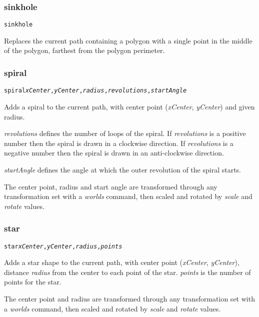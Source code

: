 \subsubsection{sinkhole}

\begin{alltt}
sinkhole
\end{alltt}

Replaces the current path containing a polygon with a single point in the
middle of the polygon, farthest from the polygon perimeter.

\subsubsection{spiral}

\begin{alltt}
spiral \textit{xCenter}, \textit{yCenter}, \textit{radius}, \textit{revolutions}, \textit{startAngle}
\end{alltt}

Adds a spiral to the current path, with center
point (\textit{xCenter}, \textit{yCenter}) and given radius.

\textit{revolutions} defines the number of loops of the spiral.
If \textit{revolutions}
is a positive number then the spiral is drawn in a clockwise direction.
If \textit{revolutions} is a negative number then the spiral
is drawn in an anti-clockwise direction.

\textit{startAngle} defines the
angle at which the outer revolution of the spiral starts.

The center point, radius and start angle are transformed through any
transformation set with a \textit{worlds} command,
then scaled and rotated by \textit{scale}
and \textit{rotate} values.

\subsubsection{star}

\begin{alltt}
star \textit{xCenter}, \textit{yCenter}, \textit{radius}, \textit{points}
\end{alltt}

Adds a star shape to the current path, with center
point (\textit{xCenter}, \textit{yCenter}), distance
\textit{radius}
from the center to each point of the star.
\textit{points} is the number of points for the star.

The center point and radius are transformed through any
transformation set with a \textit{worlds} command,
then scaled and rotated by \textit{scale}
and \textit{rotate} values.

